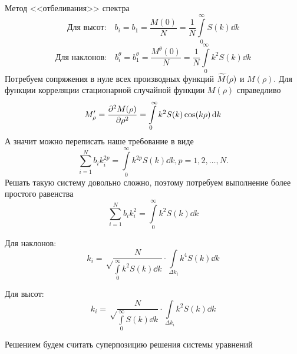 \begin{frame}[t]{}
\begin{columns}[t]
\begin{column}{.48\linewidth}
\begin{block}{Метод <<отбеливания>> спектра}
           \begin{equation}
                \text{Для высот:}\quad 	b_i=b_1= \frac{M(0)}{N}=\frac1N \int\limits_0^{\infty} S(k) \dd{k}
           \end{equation}
           \begin{equation}
                \text{Для наклонов:}\quad 	b^{\theta}_i=b^{\theta}_1= \frac{M^{\theta}(0)}{N}=\frac1N \int\limits_0^{\infty} k^2S(k) \dd{k}
           \end{equation}
            Потребуем сопряжения в нуле всех производных  функций
            $\widetilde{M}(\rho)$ и $M(\rho)$. 
            Для функции корреляции стационарной случайной функции $M(\rho)$ справедливо
            \begin{equation}
                M'_{\rho}=\pdv[2]{M(\rho)}{\rho}=\int\limits_{0}^{\infty} k^2 S(k)\cos(k \rho)\dd{k}
            \end{equation}
            А значит можно переписать наше требование в виде
            \begin{equation}
                \sum_{i=1}^N b_ik_i^{2p}=\int\limits_{0}^{\infty} k^{2p}S(k)\dd{k}, p = 1,2,\dots,N.
            \end{equation}
            Решать такую систему довольно сложно, поэтому потребуем выполнение более простого равенства
            \begin{equation}
                \sum_{i=1}^N b_ik_i^{2}=\int\limits_{0}^{\infty} k^{2}S(k)\dd{k}
            \end{equation}
            \begin{minipage}{0.49\linewidth}
                \centering Для наклонов:
                \begin{equation}
                    k_i=\sqrt\frac{N}{{\int\limits_{0}^{\infty} k^2 S(k) \dd{k}}}\cdot {\int\limits_{\Delta k_i} k^4 S(k) \dd{k}}
                \end{equation}
                \end{minipage}
                \hfill
                \begin{minipage}{0.49\linewidth}
                \centering Для высот:
                \begin{equation}
                    k_i=\sqrt\frac{N}{{\int\limits_{0}^{\infty} S(k) \dd{k}}}\cdot \int\limits_{\Delta k_i} k^2 S(k) \dd{k}
                \end{equation}
                \end{minipage}
                \vfill
                Решением будем считать суперпозицию решения системы уравнений

\end{block}
\end{column}
\end{columns}
\end{frame}
